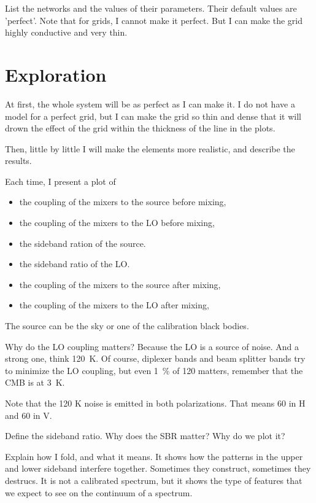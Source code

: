 List the networks and the values of their parameters.
Their default values are 'perfect'.
Note that for grids, I cannot make it perfect.  But I can make the grid highly conductive and very thin.

\section{Exploration}

At first, the whole system will be as perfect as I can make it.  I do not have a model for a perfect grid, but I can make the grid so thin and dense that it will drown the effect of the grid within the thickness of the line in the plots.

Then, little by little I will make the elements more realistic, and describe the results.

Each time, I present a plot of
\begin{itemize}
    \item the coupling of the mixers to the source before mixing,
    \item the coupling of the mixers to the LO before mixing,
    \item the sideband ration of the source.
    \item the sideband ratio of the LO.
    \item the coupling of the mixers to the source after mixing,
    \item the coupling of the mixers to the LO after mixing,
\end{itemize}

The source can be the sky or one of the calibration black bodies.

Why do the LO coupling matters?
Because the LO is a source of noise.
And a strong one, think \SI{120}{\kelvin}.
Of course, diplexer bands and beam splitter bands try to minimize the LO coupling, but even \SI{1}{\percent} of \si{120}{\kelvin} matters, remember that the CMB is at \SI{3}{\kelvin}.

Note that the 120 K noise is emitted in both polarizations.  That means 60 in H and 60 in V.

Define the sideband ratio.
Why does the SBR matter?  Why do we plot it?

Explain how I fold, and what it means.
It shows how the patterns in the upper and lower sideband interfere together.  Sometimes they construct,
sometimes they destrucs.
It is not a calibrated spectrum, but it shows the type of features that we expect to see on the continuum of a spectrum.


